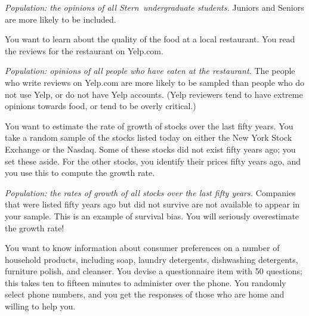 \documentclass[11pt]{exam}
\begin{document}
\begin{questions}
\begin{solution}
\textit{Population: the opinions of all Stern~undergraduate students.}
Juniors and Seniors are more likely to be included.
\end{solution}



\question You want to learn about the quality of the food at a local
restaurant.  You read the reviews for the restaurant on Yelp.com.

\begin{solution}
\textit{Population: opinions of all people who have eaten at the restaurant.}
The people who write reviews on Yelp.com are more likely to be sampled than
people who do not use Yelp, or do not have Yelp accounts.  (Yelp reviewers
tend to have extreme opinions towards food, or tend to be overly critical.)
\end{solution}


\question You want to estimate the rate of growth of stocks over the last fifty
years.  You take a random sample of the stocks listed today on either the New
York Stock Exchange or the Nasdaq.  Some of these stocks did not exist fifty
years ago; you set these aside.  For the other stocks, you identify their
prices fifty years ago, and you use this to compute the growth rate.

\begin{solution}
\textit{Population: the rates of growth of all stocks over the last fifty
years.}
Companies that were listed fifty years ago but did not survive are not
available to appear in your sample. This is an example of survival bias. You
will seriously overestimate the growth rate!
\end{solution}


\newpage

\ifprintanswers\else\newpage\fi
  
 \question You want to know information about consumer preferences on a number of
 household products, including soap, laundry detergents, dishwashing
 detergents, furniture polish, and cleanser.   You devise a questionnaire item
 with 50 questions;  this takes ten to fifteen minutes to administer over the
 phone.  You randomly select phone numbers, and you get the responses of those
 who are home and willing to help you.
 

\end{questions}
\end{document}
